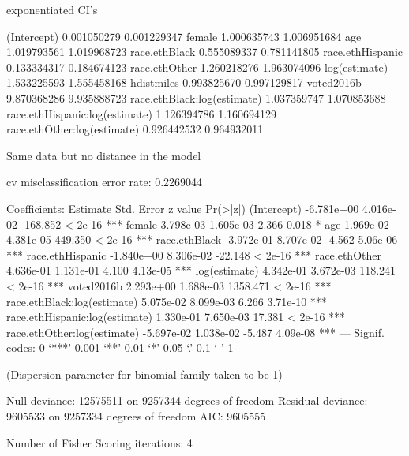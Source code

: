 exponentiated CI's

(Intercept)                    0.001050279 0.001229347
female                         1.000635743 1.006951684
age                            1.019793561 1.019968723
race.ethBlack                  0.555089337 0.781141805
race.ethHispanic               0.133334317 0.184674123
race.ethOther                  1.260218276 1.963074096
log(estimate)                  1.533225593 1.555458168
hdistmiles                     0.993825670 0.997129817
voted2016b                     9.870368286 9.935888723
race.ethBlack:log(estimate)    1.037359747 1.070853688
race.ethHispanic:log(estimate) 1.126394786 1.160694129
race.ethOther:log(estimate)    0.926442532 0.964932011


Same data but no distance in the model

cv misclassification error rate: 0.2269044

Coefficients:
                                 Estimate Std. Error  z value Pr(>|z|)    
(Intercept)                    -6.781e+00  4.016e-02 -168.852  < 2e-16 ***
female                          3.798e-03  1.605e-03    2.366    0.018 *  
age                             1.969e-02  4.381e-05  449.350  < 2e-16 ***
race.ethBlack                  -3.972e-01  8.707e-02   -4.562 5.06e-06 ***
race.ethHispanic               -1.840e+00  8.306e-02  -22.148  < 2e-16 ***
race.ethOther                   4.636e-01  1.131e-01    4.100 4.13e-05 ***
log(estimate)                   4.342e-01  3.672e-03  118.241  < 2e-16 ***
voted2016b                      2.293e+00  1.688e-03 1358.471  < 2e-16 ***
race.ethBlack:log(estimate)     5.075e-02  8.099e-03    6.266 3.71e-10 ***
race.ethHispanic:log(estimate)  1.330e-01  7.650e-03   17.381  < 2e-16 ***
race.ethOther:log(estimate)    -5.697e-02  1.038e-02   -5.487 4.09e-08 ***
---
Signif. codes:  0 ‘***’ 0.001 ‘**’ 0.01 ‘*’ 0.05 ‘.’ 0.1 ‘ ’ 1

(Dispersion parameter for binomial family taken to be 1)

    Null deviance: 12575511  on 9257344  degrees of freedom
Residual deviance:  9605533  on 9257334  degrees of freedom
AIC: 9605555

Number of Fisher Scoring iterations: 4



